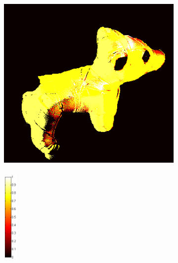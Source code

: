 \documentclass[11pt]{article}
\begin{document}
\begin{figure}[!hbt]
  \begin{subfigure}[h]{0.3\textwidth}
    \centering
    \includegraphics[width = \textwidth]{../dog-png/albedo.png}
  \end{subfigure} 
  \begin{subfigure}[h]{0.02\linewidth}
    \centering
    \includegraphics[width = 7mm, height = 48mm]{../dog-png/colorbar.png}
  \end{subfigure} 
    \begin{subfigure}[h]{0.5\textwidth}
    \centering

\end{subfigure}
\end{figure}
\end{document}
